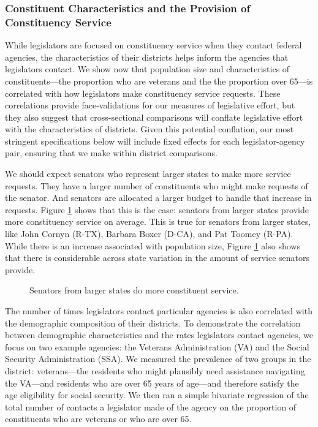 \documentclass[12pt]{article}
\begin{document}
\subsubsection{Constituent Characteristics and the Provision of Constituency Service }

While legislators are focused on constituency service when they contact federal agencies, the characteristics of their districts helps inform the agencies that legislators contact.  We show now that population size and characteristics of constituents---the proportion who are veterans and the the proportion over 65---is correlated with how legislators make constituency service requests.  These correlations provide face-validations for our measures of legislative effort, but they also suggest that cross-sectional comparisons will conflate legislative effort with the characteristics of districts.  Given this potential conflation, our most stringent specifications below will include fixed effects for each legislator-agency pair, ensuring that we make within district comparisons.   

We should expect senators who represent larger states to make more service requests.  They have a larger number of constituents who might make requests of the senator.  And senators are allocated a larger budget to handle that increase in requests.  Figure \ref{f:stateSize} shows that this is the case: senators from larger states provide more constituency service on average.  This is true for senators from larger states, like John Cornyn (R-TX), Barbara Boxer (D-CA), and Pat Toomey (R-PA).  While there is an increase associated with population size, Figure \ref{f:stateSize} also shows that there is considerable across state variation in the amount of service senators provide.  

\begin{figure}
\centering
\caption{Senators from larger states do more constituent service.} \label{f:stateSize}
\end{figure}

The number of times legislators contact particular agencies is also correlated with the demographic composition of their districts.  To demonstrate the correlation between demographic characteristics and the rates legislators contact agencies, we focus on two example agencies: the Veterans Administration (VA) and the Social Security Administration (SSA). We measured the prevalence of two groups in the district: veterans---the residents who might plausibly need assistance navigating the VA---and residents who are over 65 years of age---and therefore satisfy the age eligibility for social security. We then ran a simple bivariate regression of the total number of contacts a legislator made of the agency on the proportion of constituents who are veterans or who are over 65.  
\end{document}
